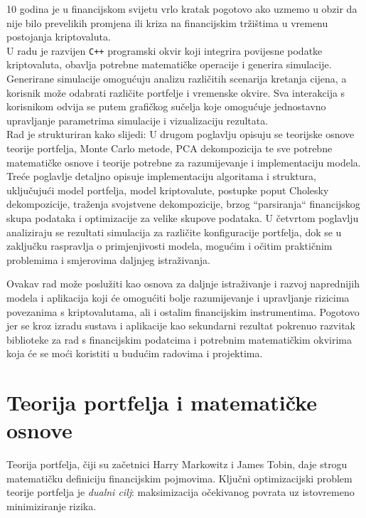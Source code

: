 \documentclass[zavrsnirad]{fer}
\begin{document}
10 godina je u financijskom svijetu vrlo kratak pogotovo ako uzmemo u obzir
da nije bilo prevelikih promjena ili kriza na financijskim tržištima
u vremenu postojanja kriptovaluta.\\
U radu je razvijen \texttt{C++} programski okvir koji integrira povijesne podatke
kriptovaluta, obavlja potrebne matematičke operacije i generira simulacije.
Generirane simulacije omogućuju analizu različitih scenarija kretanja cijena,
a korisnik može odabrati različite portfelje i vremenske okvire.
Sva interakcija s korisnikom odvija se putem grafičkog sučelja koje
omogućuje jednostavno upravljanje parametrima simulacije i vizualizaciju
rezultata.\\
Rad je strukturiran kako slijedi: U drugom poglavlju opisuju se teorijske
osnove teorije portfelja, Monte Carlo metode, PCA dekompozicija te
sve potrebne matematičke osnove i teorije potrebne za razumijevanje
i implementaciju modela.
Treće poglavlje detaljno opisuje implementaciju algoritama i struktura, uključujući
model portfelja, model kriptovalute, postupke poput Cholesky dekompozicije,
traženja svojstvene dekompozicije, brzog ``parsiranja`` financijskog skupa podataka
i optimizacije za velike skupove podataka.
U četvrtom poglavlju analiziraju se rezultati simulacija za različite
konfiguracije portfelja, dok se u zaključku raspravlja o primjenjivosti
modela, mogućim i očitim praktičnim problemima i smjerovima daljnjeg istraživanja.

Ovakav rad može poslužiti kao osnova za daljnje istraživanje i razvoj
naprednijih modela i aplikacija koji će omogućiti bolje razumijevanje i upravljanje
rizicima povezanima s kriptovalutama, ali i ostalim financijskim instrumentima.
Pogotovo jer se kroz izradu sustava i aplikacije kao sekundarni rezultat
pokrenuo razvitak biblioteke za rad s financijskim podatcima i potrebnim
matematičkim okvirima koja će se moći koristiti u budućim radovima i projektima.

\chapter{Teorija portfelja i matematičke osnove}
\label{pog:teorija_portelja}
Teorija portfelja, čiji su začetnici Harry Markowitz i James Tobin,
daje strogu matematičku definiciju financijskim pojmovima.
Ključni optimizacijski problem teorije portfelja je
\textit{dualni cilj}: maksimizacija očekivanog povrata
uz istovremeno minimiziranje rizika.
\end{document}
